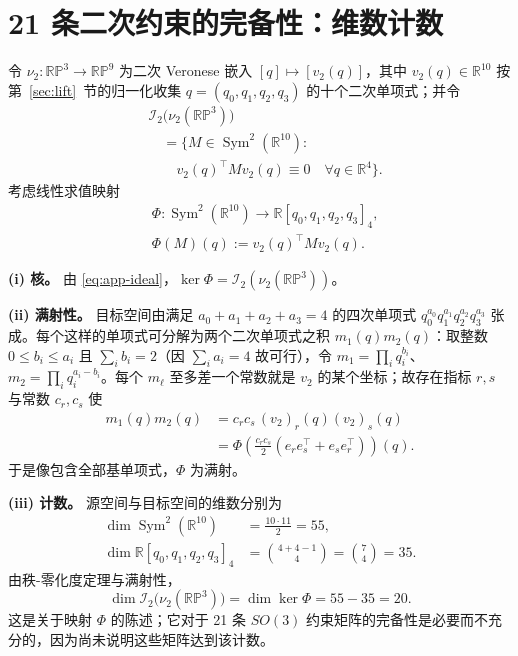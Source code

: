 \section{21 条二次约束的完备性：维数计数}\label{app:dimcount}

令 $\nu_2:\mathbb{RP}^3\to\mathbb{RP}^9$ 为二次 Veronese 嵌入 $[q]\mapsto[v_2(q)]$，其中 $v_2(q)\in\mathbb{R}^{10}$ 按第~\ref{sec:lift}~节的归一化收集 $q=(q_0,q_1,q_2,q_3)$ 的十个二次单项式；并令
\begin{equation}
\begin{split}
&\mathcal{I}_2\big(\nu_2(\mathbb{RP}^3)\big)\\
&\quad=\Big\{M\in\operatorname{Sym}^2(\mathbb{R}^{10}):\\
&\qquad v_2(q)^\top Mv_2(q)\equiv0\quad\forall q\in\mathbb{R}^4\Big\}.
\end{split}
\label{eq:app-ideal}
\end{equation}
考虑线性求值映射
\begin{equation}
\begin{split}
&\Phi:\operatorname{Sym}^2(\mathbb{R}^{10})\longrightarrow\mathbb{R}[q_0,q_1,q_2,q_3]_4,\\
&\Phi(M)(q):=v_2(q)^\top Mv_2(q).
\end{split}
\label{eq:app-phi}
\end{equation}

\textbf{(i) 核。} 由 \eqref{eq:app-ideal}，$\ker\Phi=\mathcal{I}_2(\nu_2(\mathbb{RP}^3))$。

\textbf{(ii) 满射性。} 目标空间由满足 $a_0+a_1+a_2+a_3=4$ 的四次单项式 $q_0^{a_0}q_1^{a_1}q_2^{a_2}q_3^{a_3}$ 张成。每个这样的单项式可分解为两个二次单项式之积 $m_1(q)m_2(q)$：取整数 $0\le b_i\le a_i$ 且 $\sum_ib_i=2$（因 $\sum_ia_i=4$ 故可行），令 $m_1=\prod_iq_i^{b_i}$、$m_2=\prod_iq_i^{a_i-b_i}$。每个 $m_\ell$ 至多差一个常数就是 $v_2$ 的某个坐标；故存在指标 $r,s$ 与常数 $c_r,c_s$ 使
\begin{equation}
\begin{split}
m_1(q)m_2(q)&=c_rc_s\,(v_2)_r(q)(v_2)_s(q)\\
&=\Phi\!\left(\tfrac{c_rc_s}{2}(e_re_s^\top+e_se_r^\top)\right)(q).
\end{split}
\label{eq:app-monomial}
\end{equation}
于是像包含全部基单项式，$\Phi$ 为满射。

\textbf{(iii) 计数。} 源空间与目标空间的维数分别为
\begin{equation}
\begin{split}
\dim\operatorname{Sym}^2(\mathbb{R}^{10})&=\frac{10\cdot11}{2}=55,\\
\dim\mathbb{R}[q_0,q_1,q_2,q_3]_4&=\binom{4+4-1}{4}=\binom74=35 .
\end{split}
\label{eq:app-dims}
\end{equation}
由秩-零化度定理与满射性，
\begin{equation}
\dim\mathcal{I}_2\big(\nu_2(\mathbb{RP}^3)\big)=\dim\ker\Phi=55-35=20 .
\label{eq:app-20}
\end{equation}
这是关于映射 $\Phi$ 的陈述；它对于 21 条 $SO(3)$ 约束矩阵的完备性是必要而不充分的，因为尚未说明这些矩阵达到该计数。


